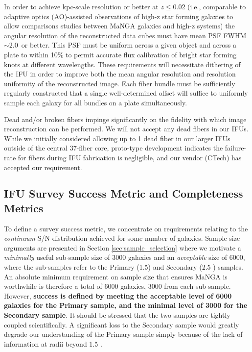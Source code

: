 \documentclass[11pt,a4paper,twoside,onecolumn,openany,final,oldfontcommands]{memoir}
\begin{document}
In order to achieve kpc-scale resolution or better at $z\leq0.02$ (i.e., comparable to adaptive optics (AO)-assisted observations of high-z star forming galaxies to allow comparisons studies between MaNGA galaxies and high-z systems) the angular resolution of the reconstructed data cubes must have mean PSF FWHM $\sim 2.0$\arcsec\ or better. This PSF must be uniform across a given object and across a plate to within 10\% to permit accurate flux calibration of bright star forming knots at different wavelengths.  These requirements will necessitate dithering of the IFU in order to improve both the mean angular resolution and resolution uniformity of the reconstructed image. Each fiber bundle must be sufficiently regularly constructed that a single well-determined offset will suffice to uniformly sample each galaxy for all bundles on a plate simultaneously.

Dead and/or broken fibers impinge significantly on the fidelity with which image reconstruction can be performed. We will not accept any dead fibers in our IFUs. While we initially considered allowing up to 1 dead fiber in our larger IFUs outside of the central 37-fiber core, proto-type development indicates the failure-rate for fibers during IFU fabrication is negligible, and our vendor (CTech) has accepted our requirement.

\subsection{IFU Survey Success Metric and Completeness Metrics}

To define a survey success metric, we concentrate on requirements relating to the {\em continuum} S/N distribution achieved for some number of galaxies.  Sample size arguments are presented in Section \ref{sec:sample_selection} where we motivate a {\em minimally} useful sub-sample size of 3000 galaxies and an {\em acceptable} size of 6000, where the sub-samples refer to the Primary (1.5\Reff) and Secondary (2.5 \Reff) samples.  An absolute minimum requirement on sample size that ensures MaNGA is worthwhile is therefore a total of 6000 galaxies, 3000 from each sub-sample. However, {\bf success is defined by meeting the acceptable level of 6000 galaxies for the Primary sample, and the minimal level of 3000 for the Secondary sample}.  It should be stressed that the two samples are tightly coupled scientifically.  A significant loss to the Secondary sample would greatly degrade our understanding of the Primary sample simply because of the lack of information at radii beyond 1.5 \Reff.
\end{document}
